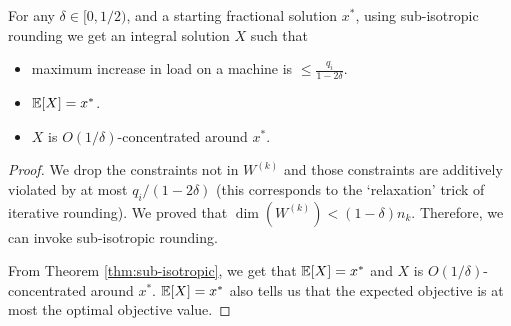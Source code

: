 
\begin{theorem}
For any $\delta \in [0,1/2)$, and a starting fractional solution $x^*$,
using sub-isotropic rounding we get an integral solution $X$ such that
\begin{itemize}
    \item maximum increase in load on a machine is $\leq \frac{q_i}{1-2\delta}$.
    \item $\operatorname{\mathbb{E}}[X] = x^*$.
    \item $X$ is $O(1/\delta)$-concentrated around $x^*$.
\end{itemize}
\end{theorem}
\begin{proof}
We drop the constraints not in $W^{(k)}$ and those constraints are
additively violated by at most $q_i/(1-2\delta)$
(this corresponds to the `relaxation' trick of iterative rounding).
We proved that $\dim(W^{(k)}) < (1-\delta)n_k$. Therefore, we can invoke sub-isotropic rounding.

From Theorem \ref{thm:sub-isotropic}, we get that $\operatorname{\mathbb{E}}[X] = x^*$ and $X$ is $O(1/\delta)$-concentrated around $x^*$.
$\operatorname{\mathbb{E}}[X] = x^*$ also tells us that the expected objective is at most the optimal objective value.
\end{proof}
